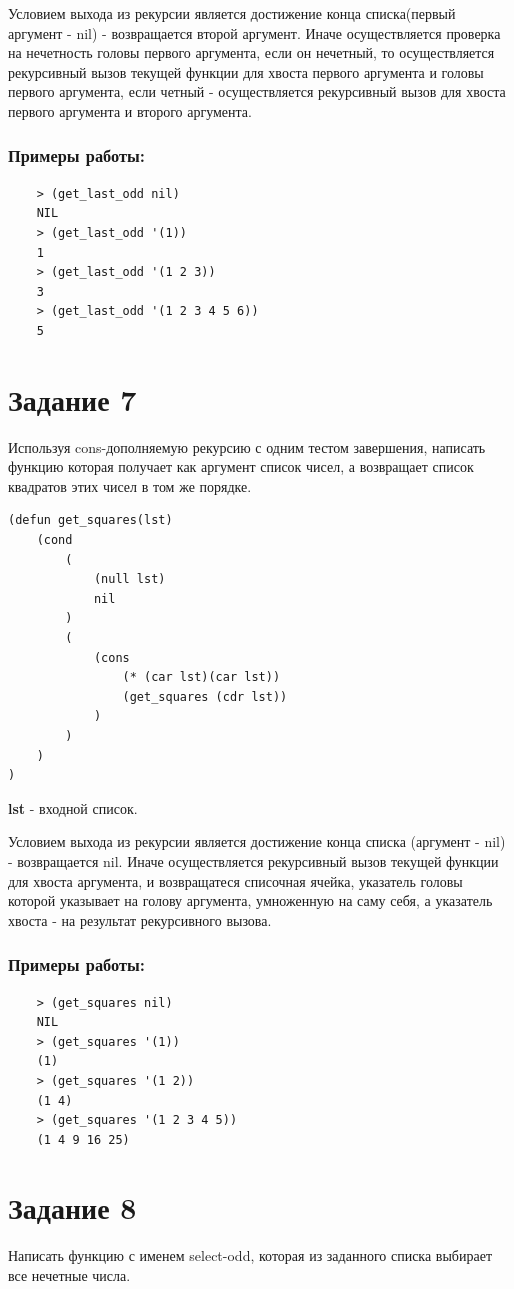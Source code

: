 \documentclass[a4paper, 12pt]{article}
\begin{document}
Условием выхода из рекурсии является достижение конца списка(первый аргумент - nil) - возвращается второй аргумент. Иначе осуществляется проверка на нечетность головы первого аргумента, если он нечетный, то осуществляется рекурсивный вызов текущей функции для хвоста первого аргумента и головы первого аргумента, если четный - осуществляется рекурсивный вызов для хвоста первого аргумента и второго аргумента.
\subsubsection*{Примеры работы:}
\begin{lstlisting}
	> (get_last_odd nil)
	NIL
	> (get_last_odd '(1))
	1
	> (get_last_odd '(1 2 3))
	3
	> (get_last_odd '(1 2 3 4 5 6))
	5
\end{lstlisting}


\section*{Задание 7}
Используя cons-дополняемую рекурсию с одним тестом завершения, написать функцию которая получает как аргумент список чисел, а возвращает список квадратов этих чисел в том же порядке. 
\begin{lstlisting}[caption=Функция получения квадратов чисел из списка]
(defun get_squares(lst)
	(cond
		(
			(null lst)
			nil
		)
		(
			(cons  
				(* (car lst)(car lst)) 
				(get_squares (cdr lst))
			)
		)
	)
)
\end{lstlisting}
\textbf{lst} - входной список.

Условием выхода из рекурсии является достижение конца списка (аргумент -  nil) - возвращается nil. Иначе осуществляется рекурсивный вызов текущей функции для хвоста аргумента, и возвращатеся списочная ячейка, указатель головы которой указывает на голову аргумента, умноженную на саму себя, а указатель хвоста - на результат рекурсивного вызова.

\subsubsection*{Примеры работы:}
\begin{lstlisting}
	> (get_squares nil)
	NIL
	> (get_squares '(1))
	(1)
	> (get_squares '(1 2))
	(1 4)
	> (get_squares '(1 2 3 4 5))
	(1 4 9 16 25)
\end{lstlisting}

\section*{Задание 8}
Написать функцию с именем select-odd, которая из заданного списка выбирает все нечетные числа.
\end{document}
